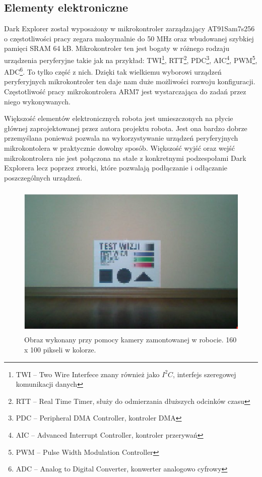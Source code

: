 \subsection{Elementy elektroniczne}
Dark Explorer został wyposażony w mikrokontroler zarządzający AT91Sam7s256 o częstotliwości pracy zegara maksymalnie do 50 MHz oraz wbudowanej szybkiej pamięci SRAM 64 kB. Mikrokontroler ten jest bogaty w różnego rodzaju urządzenia peryferyjne takie jak na przykład: TWI\footnote{TWI -- Two Wire Interfece znany również jako $I^{2}C$, interfejs szeregowej komunikacji danych}, RTT\footnote{RTT -- Real Time Timer, służy do odmierzania dłuższych odcinków czasu}, PDC\footnote{PDC -- Peripheral DMA Controller, kontroler DMA}, AIC\footnote{AIC -- Advanced Interrupt Controller, kontroler przerywań}, PWM\footnote{PWM -- Pulse Width Modulation Controller}, ADC\footnote{ADC -- Analog to Digital Converter, konwerter analogowo cyfrowy}. To tylko część z nich. Dzięki tak wielkiemu wyborowi urządzeń peryferyjnych mikrokontroler ten daje nam duże możliwości rozwoju konfiguracji. Częstotliwość pracy mikrokontrolera ARM7 jest wystarczająca do zadań przez niego wykonywanych.

Większość elementów elektronicznych robota jest umieszczonych na płycie głównej zaprojektowanej przez autora projektu robota. Jest ona bardzo dobrze przemyślana ponieważ pozwala na wykorzystywanie urządzeń peryferyjnych mikrokontolera w praktycznie dowolny sposób. Większość wyjść oraz wejść mikrokontrolera nie jest połączona na stałe z konkretnymi podzespołami Dark Explorera lecz poprzez zworki, które pozwalają podłączanie i odłączanie poszczególnych urządzeń.

\begin{figure}[!ht]
 \centering
 \includegraphics[height=75mm]{../images/ch02/160x100C.jpg}
 \caption{Obraz wykonany przy pomocy kamery zamontowanej w robocie. 160 x 100 pikseli w kolorze. \cite{KmakMScThesis2009}}
 \label{fig:160x100C}
\end{figure}


